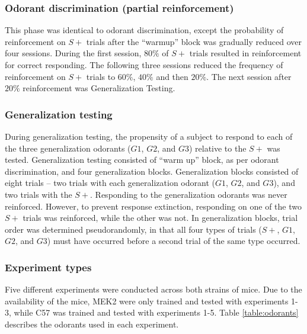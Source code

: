 \subsubsection{Odorant discrimination (partial reinforcement)}
This phase was identical to odorant discrimination, except the probability of reinforcement on $S+$ trials after the ``warmup'' block was gradually reduced over four sessions. During the first session, $80\%$ of $S+$ trials resulted in reinforcement for correct responding. The following three sessions reduced the frequency of reinforcement on $S+$ trials to $60\%$, $40\%$ and then $20\%$. The next session after $20\%$ reinforcement was Generalization Testing.

\subsubsection{Generalization testing}
During generalization testing, the propensity of a subject to respond to each of the three generalization odorants ($G1$, $G2$, and $G3$) relative to the $S+$ was tested. Generalization testing consisted of ``warm up'' block, as per odorant discrimination, and four generalization blocks. Generalization blocks consisted of eight trials – two trials with each generalization odorant ($G1$, $G2$, and $G3$), and two trials with the $S+$. Responding to the generalization odorants was never reinforced. However, to prevent response extinction, responding on one of the two $S+$ trials was reinforced, while the other was not. In generalization blocks, trial order was determined pseudorandomly, in that all four types of trials ($S+$, $G1$, $G2$, and $G3$) must have occurred before a second trial of the same type occurred.

\subsubsection{Experiment types}
Five different experiments were conducted across both strains of mice. Due to the availability of the mice, MEK2 were only trained and tested with experiments 1-3, while C57 was trained and tested with experiments 1-5.  Table \ref{table:odorants} describes the odorants used in each experiment.

